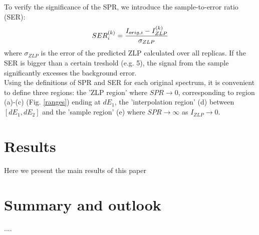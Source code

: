 \documentclass[11pt,a4paper]{article}
\def\frac#1#2{{{#1}\over {#2}}}
\numberwithin{equation}{section}
\numberwithin{figure}{section}
\numberwithin{table}{section}
\begin{document}
To verify the significance of the SPR, we introduce the sample-to-error ratio (SER):
\begin{equation}
    SER_{i}^{(k)} = \frac{I_{orig, i} - I_{ZLP}^{(k)}}{\sigma_{ZLP}}
\end{equation}
where $\sigma_{ZLP}$ is the error of the predicted ZLP calculated over all replicas. 
If the SER is bigger than a certain treshold (e.g. 5), the signal from the sample significantly excesses the background error. \\
Using the definitions of SPR and SER for each original spectrum, it is convenient to define three regions: the 'ZLP region' where $SPR \rightarrow0$, corresponding to region (a)-(c) (Fig. \ref{ranges}) ending at $dE_1$, the 'interpolation region' (d) between $[dE_1, dE_2]$ and the 'sample region' (e) where $SPR\rightarrow\infty$ as $I_{ZLP}\rightarrow0$.


\section{Results}
Here we present the main results of this paper

\section{Summary and outlook}
....


\end{document}
